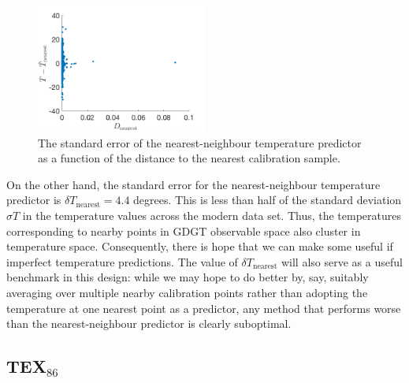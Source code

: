 \documentclass[rmp,aps,twocolumn]{revtex4-1}
\begin{document}
\begin{figure}
	\centering
	\includegraphics[width=0.5\textwidth]{Tnearest.png}
	\caption{\label{fig:Tnearest}  The standard error of the nearest-neighbour temperature predictor as a function of the distance to the nearest calibration sample.}
\end{figure}

On the other hand, the standard error for the nearest-neighbour temperature predictor is $\delta T_\mathrm{nearest} = 4.4$ degrees.  This is less than half of the standard deviation $\sigma T$ in the temperature values across the modern data set. Thus, the temperatures corresponding to nearby points in GDGT observable space also cluster in temperature space.  Consequently, there is hope that we can make some useful if imperfect temperature predictions.  The value of $\delta T_\mathrm{nearest}$ will also serve as a useful benchmark in this design: while we may hope to do better by, say, suitably averaging over multiple nearby calibration points rather than adopting the temperature at one nearest point as a predictor, any method that performs worse than the nearest-neighbour predictor is clearly suboptimal. 

\subsection{TEX$_{86}$}
\end{document}
